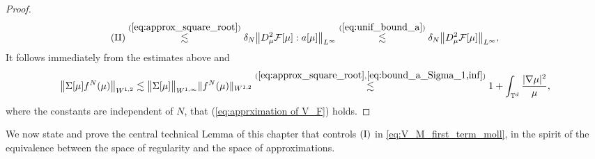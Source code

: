 \begin{proof}
\begin{align*}
    (\rom{2}) \overset{(\ref{eq:approx_square_root})}{\lesssim} \delta_N\big\|D^2_{\mu}\mcl{F}[\mu]:  a[\mu]\big\|_{L^{\infty}} \overset{(\ref{eq:unif_bound_a})}{\lesssim} \delta_N
 \big\|D^2_{\mu}\mcl{F}[\mu]\big\|_{L^{\infty}},
\end{align*}
It follows immediately from the estimates above and
\[
\big\|\Sigma[\mu]f^N(\mu)\big\|_{W^{1,2}} \lesssim \big\|\Sigma[\mu]\big\|_{W^{1,\infty}}\|f^N(\mu)\|_{W^{1,2}} \overset{(\ref{eq:approx_square_root},\ref{eq:bound_a_Sigma_1,inf})}{\lesssim} 1 + \int_{\mathbb{T}^d} \frac{|\nabla \mu|^2}{\mu},
\]
where the constants are independent of $N$, that (\ref{eq:apprximation of V_F}) holds.
\end{proof}

We now state and prove the central technical Lemma of this chapter that controls $(\rom{1})$ in \eqref{eq:V_M_first_term_moll}, in the spirit of the equivalence between the space of regularity and the space of approximations.


